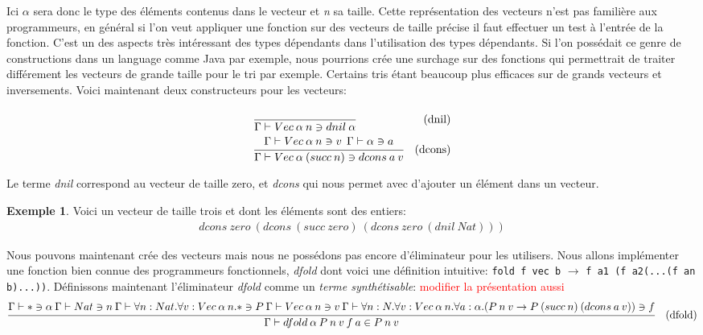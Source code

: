 \documentclass {article}
\theoremstyle{definition}
\newtheorem{example}{Exemple}
\theoremstyle{remark}
\newcommand{\todo}[1]{\textcolor{red}{#1}}
\newcommand{\fun}[1]{\lstinline!#1!}
\begin{document}
Ici $\alpha$ sera donc le type des éléments contenus dans le vecteur et \emph{n} sa taille. 
Cette représentation des vecteurs n'est pas familière aux programmeurs, en général si l'on veut appliquer une fonction sur des vecteurs 
de taille précise il faut effectuer un test à l'entrée de la fonction. C'est un des aspects très intéressant des types dépendants dans 
l'utilisation des types dépendants. Si l'on possédait ce genre de constructions dans un language comme Java par exemple, nous
pourrions crée une surchage sur des fonctions qui permettrait de traiter différement les vecteurs de grande taille pour le tri par exemple.
Certains tris étant beaucoup plus efficaces sur de grands vecteurs et inversements. 
Voici maintenant deux constructeurs pour les vecteurs:
\begin{align*}
  &\cfrac{}
  {\Gamma\vdash Vec\:\alpha\:n\ni dnil\:\alpha}&\mbox{(dnil)} \\
  &\cfrac{\Gamma\vdash Vec\:\alpha\:n\ni v \:\:\Gamma\vdash \alpha\ni a}
  {\Gamma\vdash Vec\:\alpha\:(succ\:n)\ni dcons\:a\:v}&\mbox{(dcons)} \\
\end{align*}

Le terme \emph{dnil} correspond au vecteur de taille zero, et \emph{dcons} qui nous permet avec d'ajouter un élément dans un vecteur.
\begin{example}
  Voici un vecteur de taille trois et dont les éléments sont des entiers:
  \begin{align*}
    dcons\:zero\:(dcons\:(succ\:zero)\:(dcons\:zero\:(dnil\:Nat)))
  \end{align*}  
\end{example}

Nous pouvons maintenant crée des vecteurs mais nous ne possédons pas encore d'éliminateur pour les utilisers. Nous allons 
implémenter une fonction bien connue des programmeurs fonctionnels, \emph{dfold} dont voici une définition intuitive:
\fun{fold f vec b} $\rightarrow$ \fun{f a1 (f a2(...(f an b)...))}.
Définissons maintenant l'éliminateur \emph{dfold} comme un \emph{terme synthétisable}:
\todo{modifier la présentation aussi}
\begin{align*}
  &\cfrac{\Gamma\vdash *\ni\alpha\:
    \Gamma\vdash Nat \ni n \: 
    \Gamma\vdash \forall n:Nat.\forall v:Vec\:\alpha\:n.*\ni P\:
    \Gamma\vdash Vec\:\alpha\:n\ni v\:
    \Gamma\vdash \forall n:N.\forall v:Vec\:\alpha\:n.\forall a:\alpha.(P\:n\:v\rightarrow P\:(succ\:n)\:(dcons\:a\:v))\ni f}
  {\Gamma\vdash dfold\:\alpha\:P\:n\:v\:f\:a\in P\:n\:v}&\mbox{(dfold)}
\end{align*}
\end{document}
